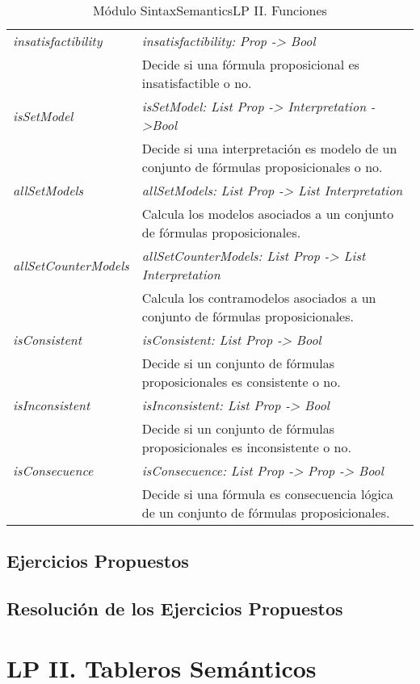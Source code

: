 \documentclass[a4paper]{report}
\begin{document}
\begin{table}[H]
\begin{tabular}{p{3cm} p{13.2cm}}
\hline
\textit{insatisfactibility}& \textit{insatisfactibility: Prop -> Bool}\\
& Decide si una fórmula proposicional es insatisfactible o no.\\
\hline
\textit{isSetModel}& \textit{isSetModel: List Prop -> Interpretation ->Bool}\\
& Decide si una interpretación es modelo de un conjunto de fórmulas proposicionales o no.\\
\hline
\textit{allSetModels}& \textit{allSetModels: List Prop -> List Interpretation}\\
& Calcula los modelos asociados a un conjunto de fórmulas proposicionales.\\
\hline
\textit{allSetCounterModels}& \textit{allSetCounterModels: List Prop -> List Interpretation}\\
& Calcula los contramodelos asociados a un conjunto de fórmulas proposicionales.\\
\hline
\textit{isConsistent}& \textit{isConsistent: List Prop -> Bool}\\
& Decide si un conjunto de fórmulas proposicionales es consistente o no.\\
\hline
\textit{isInconsistent}& \textit{isInconsistent: List Prop -> Bool}\\
& Decide si un conjunto de fórmulas proposicionales es inconsistente o no.\\
\hline
\textit{isConsecuence}& \textit{isConsecuence: List Prop -> Prop -> Bool}\\
& Decide si una fórmula es consecuencia lógica de un conjunto de fórmulas proposicionales.\\
\hline
\end{tabular}
\caption{Módulo SintaxSemanticsLP II. Funciones}
\end{table}



\section{Ejercicios Propuestos}
\section{Resolución de los Ejercicios Propuestos}
\label{sec:2.7}


\chapter{LP II. Tableros Semánticos}
\renewcommand{\mtctitle}{}
\mtcskip
\minitoc
\newpage
\end{document}
